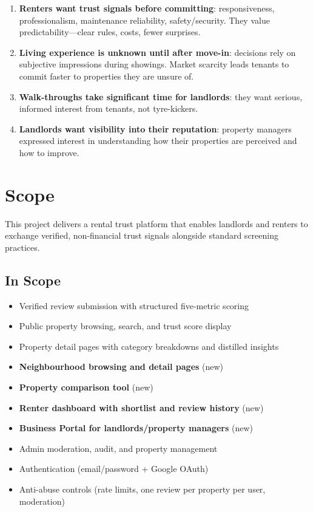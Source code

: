 \documentclass[11pt,letterpaper]{article}
\begin{document}
\begin{enumerate}
    \item \textbf{Renters want trust signals before committing}: responsiveness, professionalism, maintenance reliability, safety/security. They value predictability---clear rules, costs, fewer surprises.
    \item \textbf{Living experience is unknown until after move-in}: decisions rely on subjective impressions during showings. Market scarcity leads tenants to commit faster to properties they are unsure of.
    \item \textbf{Walk-throughs take significant time for landlords}: they want serious, informed interest from tenants, not tyre-kickers.
    \item \textbf{Landlords want visibility into their reputation}: property managers expressed interest in understanding how their properties are perceived and how to improve.
\end{enumerate}

\section{Scope}

This project delivers a rental trust platform that enables landlords and renters to exchange verified, non-financial trust signals alongside standard screening practices.

\subsection{In Scope}

\begin{itemize}
    \item Verified review submission with structured five-metric scoring
    \item Public property browsing, search, and trust score display
    \item Property detail pages with category breakdowns and distilled insights
    \item \textbf{Neighbourhood browsing and detail pages} (new)
    \item \textbf{Property comparison tool} (new)
    \item \textbf{Renter dashboard with shortlist and review history} (new)
    \item \textbf{Business Portal for landlords/property managers} (new)
    \item Admin moderation, audit, and property management
    \item Authentication (email/password + Google OAuth)
    \item Anti-abuse controls (rate limits, one review per property per user, moderation)
\end{itemize}
\end{document}

